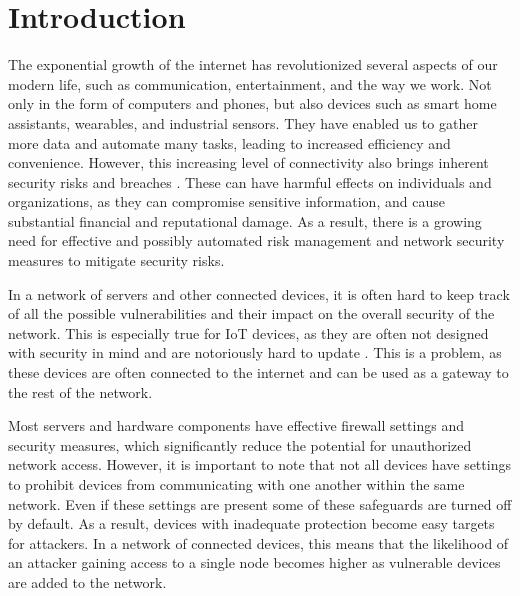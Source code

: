 \section{Introduction}
\label{sec:introduction}
The exponential growth of the internet has revolutionized several aspects of our modern life, such as communication, entertainment, and the way we work. Not only in the form of computers and phones, but also devices such as smart home assistants, wearables, and industrial sensors. They have enabled us to gather more data and automate many tasks, leading to increased efficiency and convenience. However, this increasing level of connectivity also brings inherent security risks and breaches \cite{khandelwal2016friday, wei2018casino}. These can have harmful effects on individuals and organizations, as they can compromise sensitive information, and cause substantial financial and reputational damage. As a result, there is a growing need for effective and possibly automated risk management and network security measures to mitigate security risks.

In a network of servers and other connected devices, it is often hard to keep track of all the possible vulnerabilities and their impact on the overall security of the network. This is especially true for IoT devices, as they are often not designed with security in mind \cite{miettinen2017iot} and are notoriously hard to update \cite{wurm2016security}. This is a problem, as these devices are often connected to the internet and can be used as a gateway to the rest of the network. 


Most servers and hardware components have effective firewall settings and security measures, which significantly reduce the potential for unauthorized network access. However, it is important to note that not all devices have settings to prohibit devices from communicating with one another within the same network. Even if these settings are present some of these safeguards are turned off by default. As a result, devices with inadequate protection become easy targets for attackers. In a network of connected devices, this means that the likelihood of an attacker gaining access to a single node becomes higher as vulnerable devices are added to the network.

